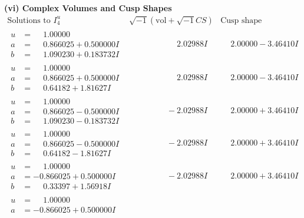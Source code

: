 \documentclass[1p]{elsarticle_modified}
\theoremstyle{definition}
\newcommand{\I}{\sqrt{-1}}
\begin{document}
\newpage\flushleft \textbf{(vi) Complex Volumes and Cusp Shapes}
$$\begin{array}{c|c|c}  
\text{Solutions to }I^u_{4}& \I (\text{vol} + \sqrt{-1}CS) & \text{Cusp shape}\\
 \hline 
\begin{aligned}
u &= \phantom{-}1.00000\phantom{ +0.000000I} \\
a &= \phantom{-}0.866025 + 0.500000 I \\
b &= \phantom{-}1.090230 + 0.183732 I\end{aligned}
 & \phantom{-0.000000 -}2.02988 I & \phantom{-}2.00000 - 3.46410 I \\ \hline\begin{aligned}
u &= \phantom{-}1.00000\phantom{ +0.000000I} \\
a &= \phantom{-}0.866025 + 0.500000 I \\
b &= \phantom{-}0.64182 + 1.81627 I\end{aligned}
 & \phantom{-0.000000 -}2.02988 I & \phantom{-}2.00000 - 3.46410 I \\ \hline\begin{aligned}
u &= \phantom{-}1.00000\phantom{ +0.000000I} \\
a &= \phantom{-}0.866025 - 0.500000 I \\
b &= \phantom{-}1.090230 - 0.183732 I\end{aligned}
 & \phantom{-0.000000 } -2.02988 I & \phantom{-}2.00000 + 3.46410 I \\ \hline\begin{aligned}
u &= \phantom{-}1.00000\phantom{ +0.000000I} \\
a &= \phantom{-}0.866025 - 0.500000 I \\
b &= \phantom{-}0.64182 - 1.81627 I\end{aligned}
 & \phantom{-0.000000 } -2.02988 I & \phantom{-}2.00000 + 3.46410 I \\ \hline\begin{aligned}
u &= \phantom{-}1.00000\phantom{ +0.000000I} \\
a &= -0.866025 + 0.500000 I \\
b &= \phantom{-}0.33397 + 1.56918 I\end{aligned}
 & \phantom{-0.000000 } -2.02988 I & \phantom{-}2.00000 + 3.46410 I \\ \hline\begin{aligned}
u &= \phantom{-}1.00000\phantom{ +0.000000I} \\
a &= -0.866025 + 0.500000 I \\

\end{aligned}
\end{array}$$
\end{document}
